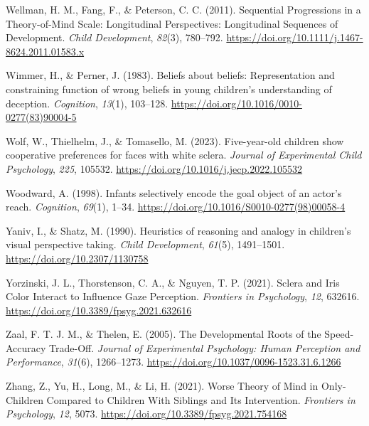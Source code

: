 \documentclass[
]{scrbook}
\newlength{\cslhangindent}
\newenvironment{CSLReferences}[2] %
 {\begin{list}{}{%
  \setlength{\itemindent}{0pt}
  \setlength{\leftmargin}{0pt}
  \setlength{\parsep}{0pt}
  \ifodd #1
   \setlength{\leftmargin}{\cslhangindent}
   \setlength{\itemindent}{-1\cslhangindent}
  \fi
  \setlength{\itemsep}{#2\baselineskip}}}
 {\end{list}}
\begin{document}
\begin{CSLReferences}{1}{0}
Wellman, H. M., Fang, F., \& Peterson, C. C. (2011). Sequential {Progressions} in a {Theory-of-Mind Scale}: {Longitudinal Perspectives}: {Longitudinal Sequences} of {Development}. \emph{Child Development}, \emph{82}(3), 780--792. \url{https://doi.org/10.1111/j.1467-8624.2011.01583.x}

Wimmer, H., \& Perner, J. (1983). Beliefs about beliefs: {Representation} and constraining function of wrong beliefs in young children's understanding of deception. \emph{Cognition}, \emph{13}(1), 103--128. \url{https://doi.org/10.1016/0010-0277(83)90004-5}

Wolf, W., Thielhelm, J., \& Tomasello, M. (2023). Five-year-old children show cooperative preferences for faces with white sclera. \emph{Journal of Experimental Child Psychology}, \emph{225}, 105532. \url{https://doi.org/10.1016/j.jecp.2022.105532}

Woodward, A. (1998). Infants selectively encode the goal object of an actor's reach. \emph{Cognition}, \emph{69}(1), 1--34. \url{https://doi.org/10.1016/S0010-0277(98)00058-4}

Yaniv, I., \& Shatz, M. (1990). Heuristics of reasoning and analogy in children's visual perspective taking. \emph{Child Development}, \emph{61}(5), 1491--1501. \url{https://doi.org/10.2307/1130758}

Yorzinski, J. L., Thorstenson, C. A., \& Nguyen, T. P. (2021). Sclera and {Iris Color Interact} to {Influence Gaze Perception}. \emph{Frontiers in Psychology}, \emph{12}, 632616. \url{https://doi.org/10.3389/fpsyg.2021.632616}

Zaal, F. T. J. M., \& Thelen, E. (2005). The {Developmental Roots} of the {Speed-Accuracy Trade-Off}. \emph{Journal of Experimental Psychology: Human Perception and Performance}, \emph{31}(6), 1266--1273. \url{https://doi.org/10.1037/0096-1523.31.6.1266}

Zhang, Z., Yu, H., Long, M., \& Li, H. (2021). Worse {Theory} of {Mind} in {Only-Children Compared} to {Children With Siblings} and {Its Intervention}. \emph{Frontiers in Psychology}, \emph{12}, 5073. \url{https://doi.org/10.3389/fpsyg.2021.754168}


\end{CSLReferences}
\end{document}
